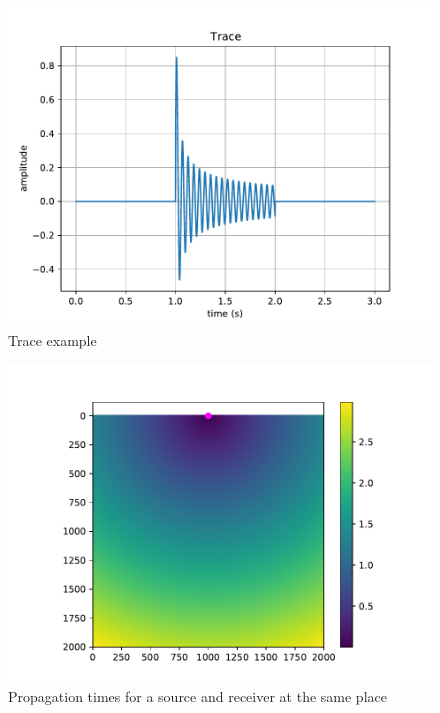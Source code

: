 \begin{figure}[H]
	\centering
	\includegraphics[scale=0.65]{trace}
	\caption{Trace example\label{fig:kirchhoff_trace}}
\end{figure}

\begin{figure}[H]
	\centering
	\includegraphics{trace1000ppt.pdf}
	\caption{Propagation times for a source and receiver at the same place\label{fig:kirchhoff_pt}}
\end{figure}

